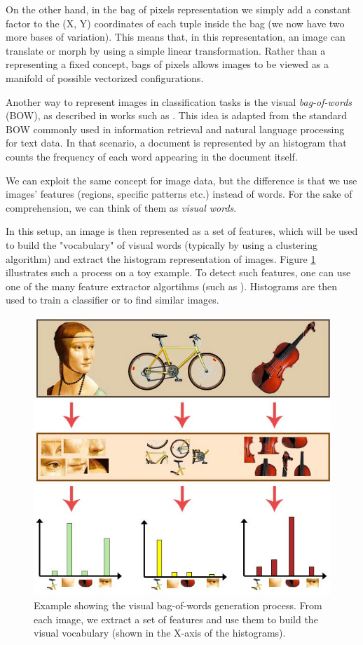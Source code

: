 \documentclass[12pt, twoside, a4paper]{report}
\begin{document}
On the other hand, in the bag of pixels representation we simply add a constant factor to the (X, Y) coordinates of each tuple inside the bag (we now have two more bases of variation). This means that, in this representation, an image can translate or morph by using a simple linear transformation. Rather than a representing a fixed concept, bags of pixels allows images to be viewed as a manifold of possible vectorized configurations.
\bigskip

Another way to represent images in classification tasks is the visual \textit{bag-of-words} (BOW), as described in works such as \cite{bag-of-keypoints, yang-visual-words, yang2-visual-words, old-visual-words, visual-word-reconstruction}. This idea is adapted from the standard BOW commonly used in information retrieval and natural language processing for text data. In that scenario, a document is represented by an histogram that counts the frequency of each word appearing in the document itself. 

We can exploit the same concept for image data, but the difference is that we use images' features (regions, specific patterns etc.) instead of words. For the sake of comprehension, we can think of them as \textit{visual words}. 

In this setup, an image is then represented as a set of features, which will be used to build the "vocabulary" of visual words (typically by using a clustering algorithm) and extract the histogram representation of images. Figure \ref{fig:visual-bag} illustrates such a process on a toy example. To detect such features, one can use one of the many feature extractor algortihms (such as \cite{sift}). Histograms are then used to train a classifier or to find similar images. 


\begin{figure}
\centering
\includegraphics[width=.5\linewidth]{images/paper-images/visual-bag.jpeg}
\caption{Example showing the visual bag-of-words generation process. From each image, we extract a set of features and use them to build the visual vocabulary (shown in the X-axis of the histograms)\protect\footnotemark .}
\label{fig:visual-bag}
\end{figure}
\end{document}
